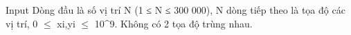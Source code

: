 Input
Dòng đầu là số vị trí N (1 ≤ N ≤ 300 000), N dòng tiếp theo là tọa độ các vị trí, 0  $\le$ xi,yi $\le$ 10^9. Không có 2 tọa độ trùng nhau.